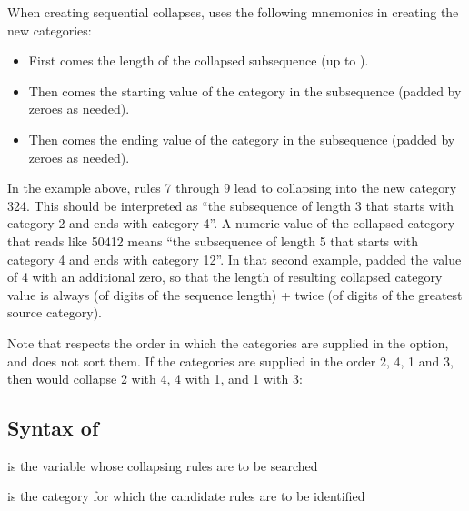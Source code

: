 When creating sequential collapses,  uses the following mnemonics
in creating the new categories:
\begin{itemize}
    \item First comes the length of the collapsed subsequence (up to ).
    \item Then comes the starting value of the category in the subsequence (padded by zeroes as needed).
    \item Then comes the ending value of the category in the subsequence (padded by zeroes as needed).
\end{itemize}

In the example above, rules 7 through 9 lead to collapsing into the new category 324. This
should be interpreted as ``the subsequence of length 3 that starts with category 2 and ends with category 4''.
A numeric value of the collapsed category that reads like 50412 means
``the subsequence of length 5 that starts with category 4 and ends with category 12''.
In that second example,  padded the value of 4 with an additional zero,
so that the length of resulting collapsed category value is always (\stnum of digits of the sequence length) +
twice (\stnum of digits of the greatest source category).

Note that  respects the order in which the categories are
supplied in the  option, and does not sort them. If the categories are supplied
in the order 2, 4, 1 and 3, then  would collapse 2 with 4, 4 with 1,
and 1 with 3:

\begin{stlog}
\nullskip
\end{stlog}


\subsection{Syntax of }


\hangpara
{} is the variable whose collapsing rules are to be searched

\hangpara
{} is the category for which the candidate rules are to be identified

